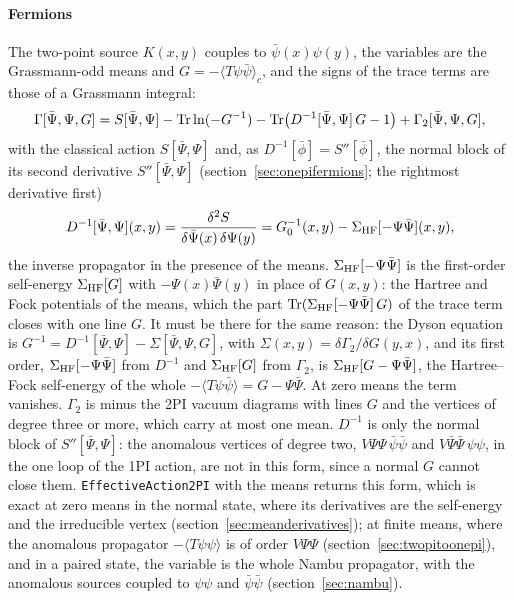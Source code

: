 \documentclass[11pt,a4paper]{article}
\newcommand{\pkg}[1]{\texttt{#1}}
\begin{document}
\paragraph{Fermions} The two-point source $K(x,y)$ couples to $\bar\psi(x)\psi(y)$, the variables are the Grassmann-odd means and
$G=-\langle T\psi\bar\psi\rangle_c$, and the signs of the trace terms are those of a Grassmann integral:
\[
\Gamma[\bar\Psi,\Psi,G]=S[\bar\Psi,\Psi]-{\rm Tr}\ln(-G^{-1})-{\rm Tr}\bigl(D^{-1}[\bar\Psi,\Psi]\,G-1\bigr)+\Gamma_2[\bar\Psi,\Psi,G],
\]
with the classical action $S[\bar\Psi,\Psi]$ and, as $D^{-1}[\bar\phi]=S''[\bar\phi]$, the normal block of its second derivative
$S''[\bar\Psi,\Psi]$ (section~\ref{sec:onepifermions}; the rightmost derivative first)
\[
D^{-1}[\bar\Psi,\Psi](x,y)=\frac{\delta^2S}{\delta\bar\Psi(x)\,\delta\Psi(y)}=G_0^{-1}(x,y)-\Sigma_{\rm HF}[-\Psi\bar\Psi](x,y),
\]
the inverse propagator in the presence of the means. $\Sigma_{\rm HF}[-\Psi\bar\Psi]$ is the first-order self-energy $\Sigma_{\rm HF}[G]$
with $-\Psi(x)\bar\Psi(y)$ in place of $G(x,y)$: the Hartree and Fock potentials of the means, which the part
${\rm Tr}(\Sigma_{\rm HF}[-\Psi\bar\Psi]\,G)$ of the trace term closes with one line $G$. It must be there for the same reason: the
Dyson equation is $G^{-1}=D^{-1}[\bar\Psi,\Psi]-\Sigma[\bar\Psi,\Psi,G]$, with $\Sigma(x,y)=\delta\Gamma_2/\delta G(y,x)$, and its first
order, $\Sigma_{\rm HF}[-\Psi\bar\Psi]$ from $D^{-1}$ and $\Sigma_{\rm HF}[G]$ from $\Gamma_2$, is $\Sigma_{\rm HF}[G-\Psi\bar\Psi]$, the Hartree--Fock
self-energy of the whole $-\langle T\psi\bar\psi\rangle=G-\Psi\bar\Psi$. At zero means the term vanishes. $\Gamma_2$ is minus the 2PI vacuum diagrams with lines $G$ and the vertices of degree three or more,
which carry at most one mean. $D^{-1}$ is only the normal block of $S''[\bar\Psi,\Psi]$: the anomalous vertices of degree
two, $V\Psi\Psi\,\bar\psi\bar\psi$ and $V\bar\Psi\bar\Psi\,\psi\psi$, in the one loop of the 1PI action, are not in this form, since a
normal $G$ cannot close them. \pkg{EffectiveAction2PI} with the means returns this form, which is exact
at zero means in the normal state, where its derivatives are the self-energy and the irreducible vertex
(section~\ref{sec:meanderivatives}); at finite means, where the anomalous propagator $-\langle T\psi\psi\rangle$ is of order
$V\Psi\Psi$ (section~\ref{sec:twopitoonepi}), and in a paired state, the variable is the whole Nambu propagator, with the
anomalous sources coupled to $\psi\psi$ and $\bar\psi\bar\psi$ (section~\ref{sec:nambu}).
\end{document}
